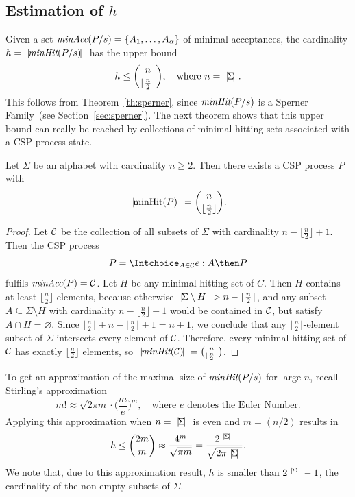 \subsection{Estimation of $h$}
Given a set $\text{\it minAcc}(P/s) = \{ A_1,\dots, A_\alpha \}$ of   minimal
acceptances, the cardinality   $h = {~|\! \text{\it minHit}(P/s)\!|~}$ has the upper bound
\[
h \le \binom{n}{\lfloor\frac{n}{2}\rfloor}, \quad \text{where $n = {~|\! \Sigma\!|~}$.}
\]
This follows from Theorem~\ref{th:sperner}, since $\text{\it minHit}(P/s)$ is a
Sperner Family~(see Section~\ref{sec:sperner}). The next theorem shows that
this upper bound can really be reached by collections of minimal hitting sets
associated with a CSP process state.

\begin{theorem}
\label{th:upperboundh}
Let  $\Sigma$  be an alphabet with cardinality $n\ge 2$.  Then
there exists a CSP process $P$ with
\[
{~|\! \text{minHit}(P)\!|~} = \binom{n}{\lfloor\frac{n}{2}\rfloor}.
\]
\end{theorem}
\begin{proof}
Let ${\cal C}$ be the collection of all subsets of $\Sigma$ with cardinality
$n-\lfloor{\frac{n}{2}}\rfloor+1$. Then the CSP process
\[
P = \Intchoice_{A\in {\cal C}} e:A\then P
\]
fulfils $\text{\it minAcc}(P) = {\cal C}$. Let $H$ be any minimal hitting set of $C$. Then
$H$ contains at least $\lfloor{\frac{n}{2}}\rfloor$ elements, because
otherwise ${~|\! \Sigma\setminus H\!|~} > n-\lfloor{\frac{n}{2}}\rfloor$, and any
subset $A\subseteq \Sigma\setminus H$ with cardinality
$n-\lfloor{\frac{n}{2}}\rfloor+1$  would be contained in ${\cal C}$, but satisfy
$A\cap H=\varnothing$. Since
$\lfloor{\frac{n}{2}}\rfloor+n-\lfloor{\frac{n}{2}}\rfloor+1=n+1$, we
conclude
 that any $\lfloor{\frac{n}{2}}\rfloor$-element subset of $\Sigma$
 intersects  every element of ${\cal C}$.  Therefore, every minimal hitting set of ${\cal C}$ has exactly $\lfloor{\frac{n}{2}}\rfloor$ elements,
so ${~|\! \text{\it minHit}({\cal C})\!|~} = \binom{n}{\lfloor{\frac{n}{2}}\rfloor}$.
\xbox
\end{proof}
%
To get an approximation of the maximal size of $\text{\it minHit}(P/s)$ for large $n$,
recall Stirling's approximation~\cite[p.~112]{Graham:1994:CMF:562056}
\[
m! \approx \sqrt{2\pi m} \cdot \big( \frac{m}{e} \big)^m, \quad\text{where $e$ denotes the Euler Number.}
\]
Applying this approximation when $n = {~|\! \Sigma\!|~}$ is even and $m = (n/2)$
results in
\[
h \le \binom{2m}{m} \approx \frac{4^m}{\sqrt{\pi m}} =
\frac{2^{~|\! \Sigma\!|~}}{\sqrt{2\pi {~|\! \Sigma\!|~}}}.
\]
%
We note that, due to this approximation result,
$h$ is   smaller than $2^{{~|\! \Sigma\!|~}}-1$, the cardinality of the
non-empty subsets of $\Sigma$.

